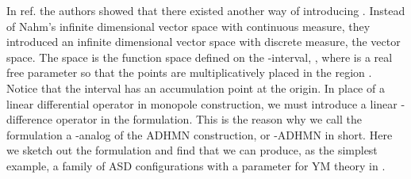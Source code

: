 \documentclass[a4paper,10pt]{article}
\providecommand{\sutwo}{\myHighlight{$SU(2)$}\coordHE{} }
\begin{document}
In ref.\cite{KN} the authors showed that there existed another way of introducing \coordHE{}.
Instead of Nahm's infinite dimensional vector space \coordHE{} with continuous measure, they introduced an infinite dimensional vector space with discrete measure, the \coordHE{} vector space.
The \coordHE{} space is the function space defined on the \coordHE{}-interval, \coordHE{}, where \coordHE{} is a real free parameter so that the points are multiplicatively placed in the region \coordHE{}.
Notice that the interval \coordHE{} has an accumulation point at the origin. 
In place of a linear differential operator \myHighlight{$\Delta$}\coordHE{} in monopole construction, we must introduce a linear \coordHE{}-difference operator in the \coordHE{} formulation.
This is the reason why we call the \coordHE{} formulation a \coordHE{}-analog of the ADHMN construction, or \coordHE{}-ADHMN in short.
Here we sketch out the \coordHE{} formulation and find that we can produce, as the simplest example, a family of ASD configurations with a parameter \coordHE{} for \sutwo YM theory in \coordHE{}.
\end{document}

